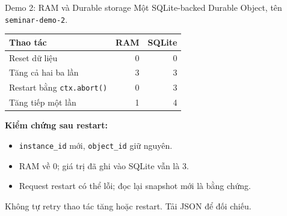 \begin{frame}{Demo 2: RAM và Durable storage}
  Một SQLite-backed Durable Object, tên \texttt{seminar-demo-2}.
  \begin{center}
    \begin{tabular}{lrr}
      Thao tác & RAM & SQLite \\\hline
      Reset dữ liệu & 0 & 0 \\
      Tăng cả hai ba lần & 3 & 3 \\
      Restart bằng \texttt{ctx.abort()} & 0 & 3 \\
      Tăng tiếp một lần & 1 & 4
    \end{tabular}
  \end{center}
  \textbf{Kiểm chứng sau restart:}
  \begin{itemize}
    \item \texttt{instance\_id} mới, \texttt{object\_id} giữ nguyên.
    \item RAM về 0; giá trị đã ghi vào SQLite vẫn là 3.
    \item Request restart có thể lỗi; đọc lại snapshot mới là bằng chứng.
  \end{itemize}
  Không tự retry thao tác tăng hoặc restart. Tải JSON để đối chiếu.
\end{frame}
